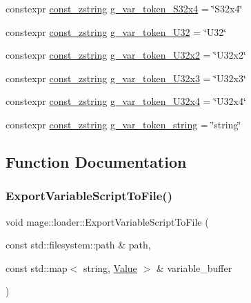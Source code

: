 \begin{DoxyCompactItemize}
\item 
constexpr \mbox{\hyperlink{namespacemage_abfd9206dc607ceb5d13ec68bf075a5c0}{const\+\_\+zstring}} \mbox{\hyperlink{namespacemage_1_1loader_ab3a474b239881e031ea4616842329f89}{g\+\_\+var\+\_\+token\+\_\+\+S32x4}} = \char`\"{}S32x4\char`\"{}
\item 
constexpr \mbox{\hyperlink{namespacemage_abfd9206dc607ceb5d13ec68bf075a5c0}{const\+\_\+zstring}} \mbox{\hyperlink{namespacemage_1_1loader_a63dac2aaefab35621db772dad6395eb6}{g\+\_\+var\+\_\+token\+\_\+\+U32}} = \char`\"{}U32\char`\"{}
\item 
constexpr \mbox{\hyperlink{namespacemage_abfd9206dc607ceb5d13ec68bf075a5c0}{const\+\_\+zstring}} \mbox{\hyperlink{namespacemage_1_1loader_ac34c8d227f509ee37fb9f4a09efc70c7}{g\+\_\+var\+\_\+token\+\_\+\+U32x2}} = \char`\"{}U32x2\char`\"{}
\item 
constexpr \mbox{\hyperlink{namespacemage_abfd9206dc607ceb5d13ec68bf075a5c0}{const\+\_\+zstring}} \mbox{\hyperlink{namespacemage_1_1loader_acc60bccde83541a750b81771ec74276e}{g\+\_\+var\+\_\+token\+\_\+\+U32x3}} = \char`\"{}U32x3\char`\"{}
\item 
constexpr \mbox{\hyperlink{namespacemage_abfd9206dc607ceb5d13ec68bf075a5c0}{const\+\_\+zstring}} \mbox{\hyperlink{namespacemage_1_1loader_ae83a00a2c31d561dfc1772e8de001531}{g\+\_\+var\+\_\+token\+\_\+\+U32x4}} = \char`\"{}U32x4\char`\"{}
\item 
constexpr \mbox{\hyperlink{namespacemage_abfd9206dc607ceb5d13ec68bf075a5c0}{const\+\_\+zstring}} \mbox{\hyperlink{namespacemage_1_1loader_a653c16a1fffe8a8f00cc11923d6243a8}{g\+\_\+var\+\_\+token\+\_\+string}} = \char`\"{}string\char`\"{}
\end{DoxyCompactItemize}


\subsection{Function Documentation}
\mbox{\label{namespacemage_1_1loader_a672938d750e13c21cdb97c013a14bcb3}} 
\subsubsection{\texorpdfstring{Export\+Variable\+Script\+To\+File()}{ExportVariableScriptToFile()}}
{\footnotesize\ttfamily void mage\+::loader\+::\+Export\+Variable\+Script\+To\+File (\begin{DoxyParamCaption}\item[{const std\+::filesystem\+::path \&}]{path,  }\item[{const std\+::map$<$ string, \mbox{\hyperlink{namespacemage_a5bc219b33037a43e23f59e4e8ddff10d}{Value}} $>$ \&}]{variable\+\_\+buffer }\end{DoxyParamCaption})}

